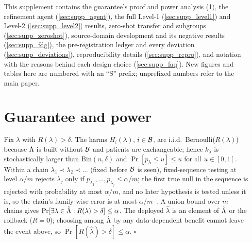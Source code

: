 \clearpage
\setcounter{page}{1}
\setcounter{section}{0}
\renewcommand{\thesection}{S\arabic{section}}
\renewcommand{\thetable}{S\arabic{table}}
\renewcommand{\thefigure}{S\arabic{figure}}
\setcounter{table}{0}
\setcounter{figure}{0}
\renewcommand{\thealgorithm}{S\arabic{algorithm}}
\setcounter{algorithm}{0}
\maketitlesupplementary

\noindent This supplement contains the guarantee's proof and power analysis (\cref{sec:supp_proof}), the refinement agent (\cref{sec:supp_agent}), the full Level-1 (\cref{sec:supp_level1}) and Level-2 (\cref{sec:supp_level2}) results, zero-shot transfer and subgroups (\cref{sec:supp_zeroshot}), source-domain development and its negative results (\cref{sec:supp_fdg}), the pre-registration ledger and every deviation (\cref{sec:supp_deviations}), reproducibility details (\cref{sec:supp_repro}), and notation with the reasons behind each design choice (\cref{sec:supp_faq}). New figures and tables here are numbered with an ``S'' prefix; unprefixed numbers refer to the main paper.

\section{Guarantee and power}
\label{sec:supp_proof}

Fix $\lambda$ with $R(\lambda)>\delta$. The harms $H_i(\lambda)$, $i\in\mathcal{B}$, are i.i.d.\ Bernoulli($R(\lambda)$) because $\Lambda$ is built without $\mathcal{B}$ and patients are exchangeable; hence $k_\lambda$ is stochastically larger than $\mathrm{Bin}(n,\delta)$ and $\Pr[p_\lambda\le u]\le u$ for all $u\in[0,1]$.
Within a chain $\lambda_{1}\prec\lambda_{2}\prec\dots$ (fixed before $\mathcal{B}$ is seen), fixed-sequence testing at level $\alpha/m$ rejects $\lambda_j$ only if $p_{\lambda_1},\dots,p_{\lambda_j}\le\alpha/m$; the first true null in the sequence is rejected with probability at most $\alpha/m$, and no later hypothesis is tested unless it is, so the chain's family-wise error is at most $\alpha/m$~\cite{bretz2010multiple}.
A union bound over $m$ chains gives $\Pr[\exists\lambda\in\hat{\Lambda}: R(\lambda)>\delta]\le\alpha$.
The deployed $\hat\lambda$ is an element of $\hat{\Lambda}$ or the rollback ($R=0$); choosing among $\hat{\Lambda}$ by any data-dependent benefit cannot leave the event above, so $\Pr[R(\hat\lambda)>\delta]\le\alpha$. \hfill$\square$

